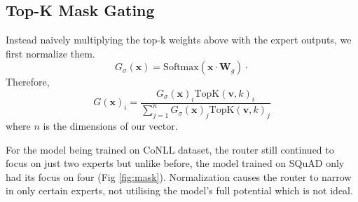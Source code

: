 \documentclass[12pt]{article}
\begin{document}
\subsection{Top-K Mask Gating}
Instead naively multiplying the top-k weights above with the expert outputs, we first normalize them.
$$
G_{\sigma}(\mathbf{x}) = \text{Softmax}(\mathbf{x\cdot W}_g)\cdot 
$$
Therefore,
\begin{equation}
G(\mathbf{x})_i = \frac{G_{\sigma}(\mathbf{x})_i\text{TopK}(\mathbf{v}, k)_i}{\sum_{j=1}^nG_{\sigma}(\mathbf{x})_j\text{TopK}(\mathbf{v}, k)_j}
\end{equation}
where $n$ is the dimensions of our vector.

For the model being trained on CoNLL dataset, the router still continued to focus on just two experts but unlike before, the model trained on SQuAD only had its focus on four (Fig \ref{fig:mask}). Normalization causes the router to narrow in only certain experts, not utilising the model's full potential which is not ideal.
\end{document}
